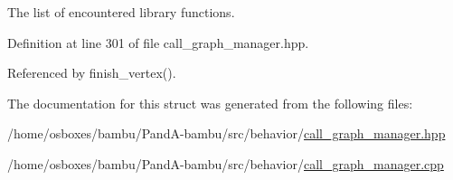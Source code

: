 The list of encountered library functions. 



Definition at line 301 of file call\+\_\+graph\+\_\+manager.\+hpp.



Referenced by finish\+\_\+vertex().



The documentation for this struct was generated from the following files\+:\begin{DoxyCompactItemize}
\item 
/home/osboxes/bambu/\+Pand\+A-\/bambu/src/behavior/\hyperlink{call__graph__manager_8hpp}{call\+\_\+graph\+\_\+manager.\+hpp}\item 
/home/osboxes/bambu/\+Pand\+A-\/bambu/src/behavior/\hyperlink{call__graph__manager_8cpp}{call\+\_\+graph\+\_\+manager.\+cpp}\end{DoxyCompactItemize}
